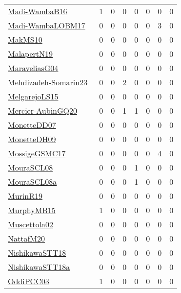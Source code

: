 {\begin{longtable}{l*{7}{r}}
\href{papers/Madi-WambaB16.pdf}{Madi-WambaB16}~\cite{Madi-WambaB16} & 1 & 0 & 0 & 0 & 0 & 0 & 0\\
\href{papers/Madi-WambaLOBM17.pdf}{Madi-WambaLOBM17}~\cite{Madi-WambaLOBM17} & 0 & 0 & 0 & 0 & 0 & 3 & 0\\
\href{papers/MakMS10.pdf}{MakMS10}~\cite{MakMS10} & 0 & 0 & 0 & 0 & 0 & 0 & 0\\
\href{papers/MalapertN19.pdf}{MalapertN19}~\cite{MalapertN19} & 0 & 0 & 0 & 0 & 0 & 0 & 0\\
\href{papers/MaraveliasG04.pdf}{MaraveliasG04}~\cite{MaraveliasG04} & 0 & 0 & 0 & 0 & 0 & 0 & 0\\
\href{papers/Mehdizadeh-Somarin23.pdf}{Mehdizadeh-Somarin23}~\cite{Mehdizadeh-Somarin23} & 0 & 0 & 2 & 0 & 0 & 0 & 0\\
\href{papers/MelgarejoLS15.pdf}{MelgarejoLS15}~\cite{MelgarejoLS15} & 0 & 0 & 0 & 0 & 0 & 0 & 0\\
\href{papers/Mercier-AubinGQ20.pdf}{Mercier-AubinGQ20}~\cite{Mercier-AubinGQ20} & 0 & 0 & 1 & 1 & 0 & 0 & 0\\
\href{papers/MonetteDD07.pdf}{MonetteDD07}~\cite{MonetteDD07} & 0 & 0 & 0 & 0 & 0 & 0 & 0\\
\href{papers/MonetteDH09.pdf}{MonetteDH09}~\cite{MonetteDH09} & 0 & 0 & 0 & 0 & 0 & 0 & 0\\
\href{papers/MossigeGSMC17.pdf}{MossigeGSMC17}~\cite{MossigeGSMC17} & 0 & 0 & 0 & 0 & 0 & 4 & 0\\
\href{papers/MouraSCL08.pdf}{MouraSCL08}~\cite{MouraSCL08} & 0 & 0 & 0 & 1 & 0 & 0 & 0\\
\href{papers/MouraSCL08a.pdf}{MouraSCL08a}~\cite{MouraSCL08a} & 0 & 0 & 0 & 1 & 0 & 0 & 0\\
\href{papers/MurinR19.pdf}{MurinR19}~\cite{MurinR19} & 0 & 0 & 0 & 0 & 0 & 0 & 0\\
\href{papers/MurphyMB15.pdf}{MurphyMB15}~\cite{MurphyMB15} & 1 & 0 & 0 & 0 & 0 & 0 & 0\\
\href{papers/Muscettola02.pdf}{Muscettola02}~\cite{Muscettola02} & 0 & 0 & 0 & 0 & 0 & 0 & 0\\
\href{papers/NattafM20.pdf}{NattafM20}~\cite{NattafM20} & 0 & 0 & 0 & 0 & 0 & 0 & 0\\
\href{papers/NishikawaSTT18.pdf}{NishikawaSTT18}~\cite{NishikawaSTT18} & 0 & 0 & 0 & 0 & 0 & 0 & 0\\
\href{papers/NishikawaSTT18a.pdf}{NishikawaSTT18a}~\cite{NishikawaSTT18a} & 0 & 0 & 0 & 0 & 0 & 0 & 0\\
\href{papers/OddiPCC03.pdf}{OddiPCC03}~\cite{OddiPCC03} & 1 & 0 & 0 & 0 & 0 & 0 & 0\\

\end{longtable}}
